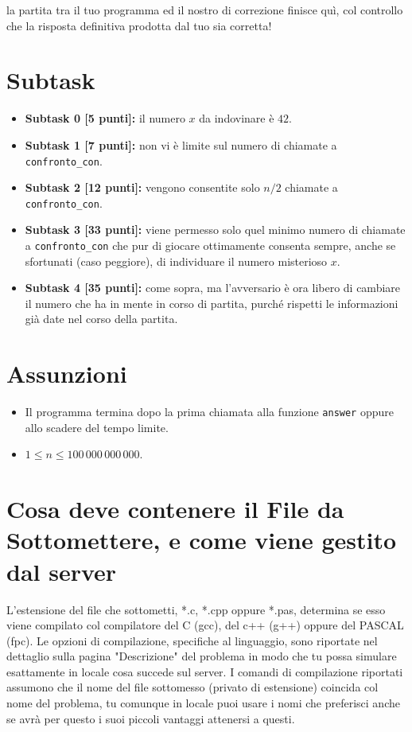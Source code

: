 \documentclass[a4paper,11pt]{article}
\begin{document}
  \vspace{0.2cm}
  
  \noindent
  la partita tra il tuo programma ed il nostro di correzione finisce quì,
  col controllo che la risposta definitiva prodotta dal tuo sia corretta!
  
  \section*{Subtask}
  \begin{itemize}
    \item \textbf{Subtask 0 [5 punti]:} il numero $x$ da indovinare è $42$.
    \item \textbf{Subtask 1 [7 punti]:} non vi è limite sul numero di chiamate a \texttt{confronto\_con}.
    \item \textbf{Subtask 2 [12 punti]:} vengono consentite solo $n/2$ chiamate a \texttt{confronto\_con}.
    \item \textbf{Subtask 3 [33 punti]:} viene permesso solo quel minimo numero di chiamate a \texttt{confronto\_con} che pur di giocare ottimamente consenta sempre, anche se sfortunati (caso peggiore), di individuare il numero misterioso $x$.
    \item \textbf{Subtask 4 [35 punti]:} come sopra, ma l'avversario è ora libero di cambiare il numero che ha in mente in corso di partita, purché rispetti le informazioni già date nel corso della partita.
  \end{itemize}
  
  \section*{Assunzioni}
  \begin{itemize}[nolistsep, noitemsep]
    \item Il programma termina dopo la prima chiamata alla funzione \texttt{answer} oppure allo scadere del tempo limite.
    \item $1 \le n \le 100\,000\,000\,000$.
  \end{itemize}

  \section*{Cosa deve contenere il File da Sottomettere, e come viene gestito dal server}

  L'estensione del file che sottometti, *.c, *.cpp oppure *.pas,
  determina se esso viene compilato col compilatore del C (gcc),
  del c++ (g++) oppure del PASCAL (fpc).
  Le opzioni di compilazione, specifiche al linguaggio,
  sono riportate nel dettaglio sulla pagina "Descrizione" del problema
  in modo che tu possa simulare esattamente in locale cosa succede sul server.
  I comandi di compilazione riportati assumono che il nome del file sottomesso (privato di estensione) coincida col nome del problema, tu comunque in locale puoi usare i nomi che preferisci anche se avrà per questo i suoi piccoli vantaggi attenersi a questi.
\end{document}
